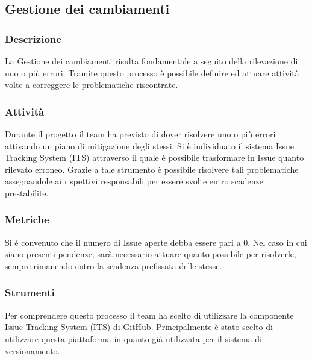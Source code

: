 \subsection{Gestione dei cambiamenti}
	
	\subsubsection{Descrizione}
		La Gestione dei cambiamenti risulta fondamentale a seguito della rilevazione di uno o più errori. Tramite questo processo è possibile definire ed attuare attività volte a correggere le problematiche riscontrate.
	
	
	\subsubsection{Attività}
			Durante il progetto il team ha previsto di dover risolvere uno o più errori attivando un piano di mitigazione degli stessi. Si è individuato il sistema Issue Tracking System (ITS) attraverso il quale è possibile trasformare in Issue quanto rilevato erroneo. Grazie a tale strumento è possibile risolvere tali problematiche assegnandole ai rispettivi responsabili per essere svolte entro scadenze prestabilite.
	
	
	\subsubsection{Metriche}
			Si è convenuto che il numero di Issue aperte debba essere pari a 0. Nel caso in cui siano presenti pendenze, sarà necessario attuare quanto possibile per risolverle, sempre rimanendo entro la scadenza prefissata delle stesse.
			
			
	\subsubsection{Strumenti}
			Per comprendere questo processo il team ha scelto di utilizzare la componente Issue Tracking System (ITS) di GitHub. Principalmente è stato scelto di utilizzare questa piattaforma in quanto già utilizzata per il sistema di versionamento.